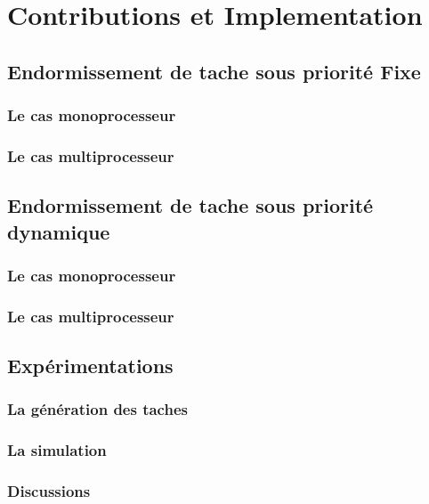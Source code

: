 \part{Contributions et Implementation}
\chapter{Endormissement de tache sous priorité Fixe}
\section{Le cas monoprocesseur}
\section{Le cas multiprocesseur}
\chapter{Endormissement de tache sous priorité dynamique}
\section{Le cas monoprocesseur}
\section{Le cas multiprocesseur}
\chapter{Expérimentations}
\section{La génération des taches}
\section{La simulation}
\section{Discussions}